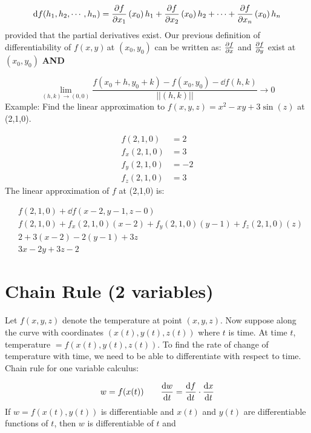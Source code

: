 \documentclass{article}
\newcommand{\n}{\leavevmode \newline} %
\newcommand{\fxy}{$f(x,y)\,$} %
\numberwithin{equation}{subsection} %
\begin{document}
\begin{equation}
    \dd f(h_1,h_2,\cdots,h_n)=\pdv{f}{x_1}\left(x_0\right)h_1+\pdv{f}{x_2}\left(x_0\right)h_2+\cdots+\pdv{f}{x_n}\left(x_0\right)h_n
\end{equation}
\n
provided that the partial derivatives exist. Our previous definition of differentiability of \fxy at $(x_0,y_0)$ can be written as: $\pdv{f}{x}$ and $\pdv{f}{y}$ exist at $(x_0,y_0)$ \textbf{AND}

\begin{equation}
    \lim_{(h,k)\to(0,0)}\frac{f(x_0+h,y_0+k)-f(x_0,y_0)-\dd f(h,k)}{||(h,k)||}\to 0
\end{equation}
\n
Example: Find the linear approximation to $f(x,y,z)=x^2-xy+3\sin(z)$ at (2,1,0).

\begin{equation}
    \begin{split}
        f(2,1,0)&=2\\
        f_x(2,1,0)&=3\\
        f_y(2,1,0)&=-2\\
        f_z(2,1,0)&=3
    \end{split}
\end{equation}
\n
The linear approximation of $f$ at (2,1,0) is:

\begin{equation}
    \begin{split}
        &f(2,1,0)+\dd f(x-2,y-1,z-0)\\
        &f(2,1,0)+f_x(2,1,0)(x-2)+f_y(2,1,0)(y-1)+f_z(2,1,0)(z)\\
        &2+3(x-2)-2(y-1)+3z\\
        &3x-2y+3z-2
    \end{split}
\end{equation}

\section{Chain Rule (2 variables)}
Let $f(x,y,z)$ denote the temperature at point $(x,y,z)$. Now suppose along the curve with coordinates $(x(t),y(t),z(t))$ where $t$ is time. At time $t$, temperature $=f(x(t),y(t),z(t))$. To find the rate of change of temperature with time, we need to be able to differentiate with respect to time. Chain rule for one variable calculus:

\begin{equation}
    w=f(x(t)) \qquad \dv{w}{t}=\dv{f}{t}\cdot\dv{x}{t}
\end{equation}
\n
If $w=f(x(t),y(t))$ is differentiable and $x(t)$ and $y(t)$ are differentiable functions of $t$, then $w$ is differentiable of $t$ and
\end{document}
